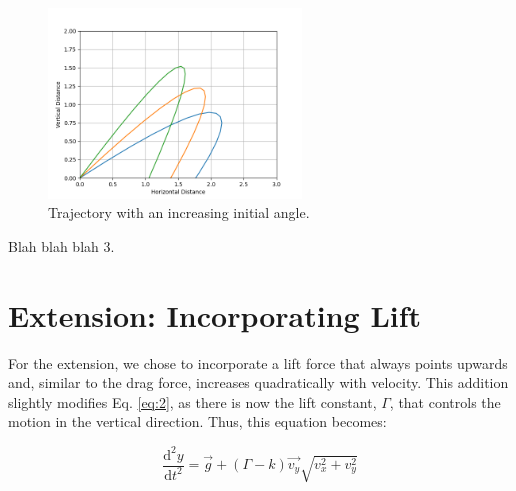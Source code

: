 \documentclass[12pt]{iopart} %
\begin{document}
\begin{figure}[h!tbp]
  \begin{center}
 \item[]\includegraphics[width=0.6\textwidth]{figure5.png}
  \caption{\label{fig:figure5}
  Trajectory with an increasing initial angle.
  }
  \end{center}
\end{figure}

\pagebreak

\begin{center}
\subtitle{\textbf{Firing Range}}
\end{center}

Blah blah blah 3.


\pagebreak

\section{Extension: Incorporating Lift}

For the extension, we chose to incorporate a lift force that always points upwards and, similar to the drag force, increases quadratically with velocity.
This addition slightly modifies Eq. \ref{eq:2}, as there is now the lift constant, $\Gamma$, that controls the motion in the vertical direction.
Thus, this equation becomes:

\begin{equation} \label{eq:3}
  \frac{\mathrm{d}^2 y}{\mathrm{d}t^2} = \vec{g} + (\Gamma - k) \vec{v_y} \sqrt{v_x^2+v_y^2}
\end{equation}
\end{document}
